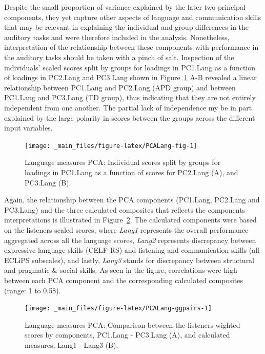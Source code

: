 \documentclass[a4paper, twoside]{templates/ociamthesis}
\begin{document}
Despite the small proportion of variance explained by the later two principal components, they yet capture other aspects of language and communication skills that may be relevant in explaining the individual and group differences in the auditory tasks and were therefore included in the analysis. Nonetheless, interpretation of the relationship between these components with performance in the auditory tasks should be taken with a pinch of salt. Inspection of the individuals' scaled scores split by groups for loadings in PC1.Lang as a function of loadings in PC2.Lang and PC3.Lang shown in Figure~\ref{fig:PCALang-fig} A-B revealed a linear relationship between PC1.Lang and PC2.Lang (APD group) and between PC1.Lang and PC3.Lang (TD group), thus indicating that they are not entirely independent from one another. The partial lack of independence my be in part explained by the large polarity in scores between the groups across the different input variables.\\

\begin{figure}

{\centering \texttt{[image: \_main\_files/figure-latex/PCALang-fig-1]} 

}

\caption{Language measures PCA: Individual scores split by groups for loadings in PC1.Lang as a function of scores for PC2.Lang (A), and PC3.Lang (B).}\label{fig:PCALang-fig}
\end{figure}

Again, the relationship between the PCA components (PC1.Lang, PC2.Lang and PC3.Lang) and the three calculated composites that reflects the components interpretations is illustrated in Figure~\ref{fig:PCALang-ggpairs}. The calculated components were based on the listeners scaled scores, where \emph{Lang1} represents the overall performance aggregated across all the language scores, \emph{Lang2} represents discrepancy between expressive language skills (CELF-RS) and listening and communication skills (all ECLiPS subscales), and lastly, \emph{Lang3} stands for discrepancy between structural and pragmatic \& social skills. As seen in the figure, correlations were high between each PCA component and the corresponding calculated composites (range: 1 to 0.58).\\

\begin{figure}

{\centering \texttt{[image: \_main\_files/figure-latex/PCALang-ggpairs-1]} 

}

\caption{Language measures PCA: Comparison between the listeners wighted scores by components, PC1.Lang - PC3.Lang (A), and calculated measures, Lang1 - Lang3 (B).}\label{fig:PCALang-ggpairs}
\end{figure}
\end{document}
